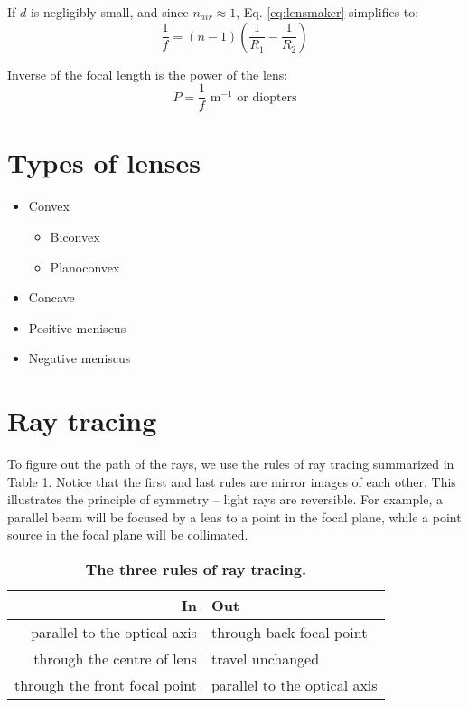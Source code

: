 \documentclass{article}
\begin{document}
If $d$ is negligibly small, and since $n_{air} \approx 1$, Eq. \ref{eq:lensmaker} simplifies to:
\begin{equation}
	\frac{1}{f} = (n-1)\left(\frac{1}{R_1} - \frac{1}{R_2}\right)
\end{equation}

Inverse of the focal length is the power of the lens:
\begin{equation}
	P = \frac{1}{f} \text{ m$^{-1}$ or diopters}
\end{equation}

\section{Types of lenses}
\begin{itemize}
	\item Convex
	\begin{itemize}
		\item Biconvex
		\item Planoconvex
	\end{itemize}
	\item Concave
	\item Positive meniscus
	\item Negative meniscus
\end{itemize}

\section{Ray tracing}
To figure out the path of the rays, we use the rules of ray tracing summarized in Table 1. Notice that the first and last rules are mirror images of each other. This illustrates the principle of symmetry -- light rays are reversible. For example, a parallel beam will be focused by a lens to a point in the focal plane, while a point source in the focal plane will be collimated.

\begin{table}[!b]
\centering
\begin{tabularx}{0.8\textwidth}{r | l}
\toprule
\textbf{In} & \textbf{Out}
\\ \midrule
parallel to the optical axis & through back focal point \\
through the centre of lens & travel unchanged \\
through the front focal point & parallel to the optical axis \\
\bottomrule
\end{tabularx}
\label{tbl:rules}
\caption{
{\bf The three rules of ray tracing.}}
\end{table}
\end{document}
